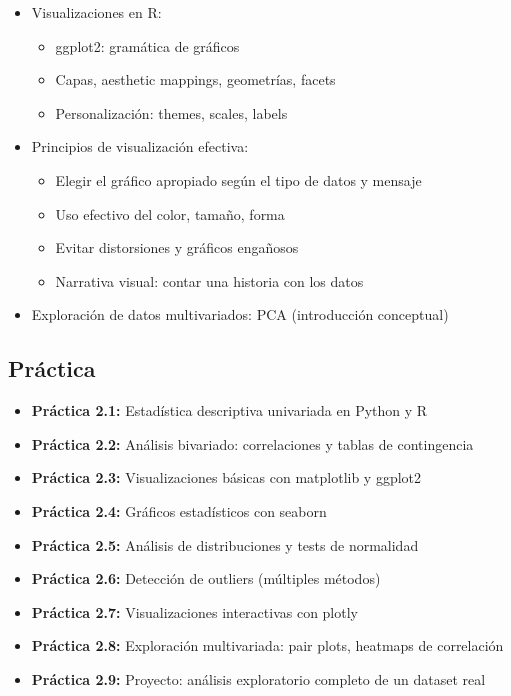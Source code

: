 \documentclass[a4paper,11pt]{article}
\begin{document}
\begin{itemize}[leftmargin=*]
\begin{itemize}
        \item Tipos: histogramas, boxplots, scatter plots, line plots, heatmaps, pair plots
    \end{itemize}
    \item Visualizaciones en R:
    \begin{itemize}
        \item ggplot2: gramática de gráficos
        \item Capas, aesthetic mappings, geometrías, facets
        \item Personalización: themes, scales, labels
    \end{itemize}
    \item Principios de visualización efectiva:
    \begin{itemize}
        \item Elegir el gráfico apropiado según el tipo de datos y mensaje
        \item Uso efectivo del color, tamaño, forma
        \item Evitar distorsiones y gráficos engañosos
        \item Narrativa visual: contar una historia con los datos
    \end{itemize}
    \item Exploración de datos multivariados: PCA (introducción conceptual)
\end{itemize}

\subsection{Práctica}
\begin{itemize}[leftmargin=*, labelindent=0pt, label={\textcolor{practicacolor}{$\blacktriangleright$}}]
    \item \textbf{Práctica 2.1:} Estadística descriptiva univariada en Python y R
    \item \textbf{Práctica 2.2:} Análisis bivariado: correlaciones y tablas de contingencia
    \item \textbf{Práctica 2.3:} Visualizaciones básicas con matplotlib y ggplot2
    \item \textbf{Práctica 2.4:} Gráficos estadísticos con seaborn
    \item \textbf{Práctica 2.5:} Análisis de distribuciones y tests de normalidad
    \item \textbf{Práctica 2.6:} Detección de outliers (múltiples métodos)
    \item \textbf{Práctica 2.7:} Visualizaciones interactivas con plotly
    \item \textbf{Práctica 2.8:} Exploración multivariada: pair plots, heatmaps de correlación
    \item \textbf{Práctica 2.9:} Proyecto: análisis exploratorio completo de un dataset real
\end{itemize}
\end{document}
